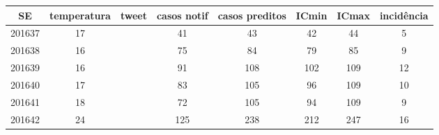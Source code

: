 \begin{tabular}{c|ccccccc}
  \hline
SE & temperatura & tweet & casos notif & casos preditos & ICmin & ICmax & incidência \\ 
  \hline
201637 & 17 &  & 41 & 43 & 42 & 44 & 5 \\ 
  201638 & 16 &  & 75 & 84 & 79 & 85 & 9 \\ 
  201639 & 16 &  & 91 & 108 & 102 & 109 & 12 \\ 
  201640 & 17 &  & 83 & 105 & 96 & 109 & 10 \\ 
  201641 & 18 &  & 72 & 105 & 94 & 109 & 9 \\ 
  201642 & 24 &  & 125 & 238 & 212 & 247 & 16 \\ 
   \hline
\end{tabular}
